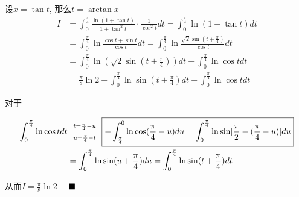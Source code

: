 \documentclass[lang=cn,newtx,10pt,scheme=chinese]{elegantbook}
\begin{document}
\begin{solution}
设$x=\tan t$, 那么$t=\arctan x$
\begin{align*}
I &= \int_{0}^{\frac{\pi}{4}}\frac{\ln(1+\tan t)}{1+\tan^2 t}\cdot\frac{1}{\cos^2 t}dt = \int_{0}^{\frac{\pi}{4}}\ln(1+\tan t)dt \\
&= \int_{0}^{\frac{\pi}{4}}\ln\frac{\cos t+\sin t}{\cos t}dt = \int_{0}^{\frac{\pi}{4}}\ln\frac{\sqrt{2}\sin(t+\frac{\pi}{4})}{\cos t}dt \\
&= \int_{0}^{\frac{\pi}{4}}\ln(\sqrt{2}\sin(t+\frac{\pi}{4}))dt - \int_{0}^{\frac{\pi}{4}}\ln\cos t dt \\
&= \frac{\pi}{8}\ln 2 + \int_{0}^{\frac{\pi}{4}}\ln\sin(t+\frac{\pi}{4})dt - \int_{0}^{\frac{\pi}{4}}\ln\cos t dt
\end{align*}

对于



\begin{align*}
    \int_{0}^{\frac{\pi}{4}}\ln\cos t dt &\xlongequal[u=\frac{\pi}{4}-t]{t=\frac{\pi}{4}-u} \boxed{-\int_{\frac{\pi}{4}}^{0}\ln\cos(\frac{\pi}{4}-u)du = \int_{0}^{\frac{\pi}{4}}\ln\sin[\frac{\pi}{2}-(\frac{\pi}{4}-u)]du}\\
&= \int_{0}^{\frac{\pi}{4}}\ln\sin(u+\frac{\pi}{4})du = \int_{0}^{\frac{\pi}{4}}\ln\sin(t+\frac{\pi}{4})dt
\end{align*}

从而$I=\frac{\pi}{8}\ln 2 \quad  $ $\hfill \blacksquare$
\end{solution}
\end{document}
